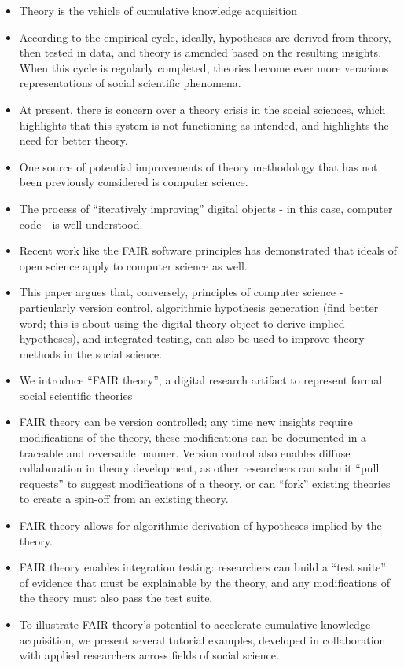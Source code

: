 \documentclass[
  man,floatsintext]{apa6}
\providecommand{\tightlist}{%
  \setlength{\itemsep}{0pt}\setlength{\parskip}{0pt}}
\begin{document}
\begin{itemize}
\tightlist
\item
  Theory is the vehicle of cumulative knowledge acquisition
\item
  According to the empirical cycle, ideally, hypotheses are derived from theory, then tested in data, and theory is amended based on the resulting insights. When this cycle is regularly completed, theories become ever more veracious representations of social scientific phenomena.
\item
  At present, there is concern over a theory crisis in the social sciences, which highlights that this system is not functioning as intended, and highlights the need for better theory.
\item
  One source of potential improvements of theory methodology that has not been previously considered is computer science.
\item
  The process of ``iteratively improving'' digital objects - in this case, computer code - is well understood.
\item
  Recent work like the FAIR software principles has demonstrated that ideals of open science apply to computer science as well.
\item
  This paper argues that, conversely, principles of computer science - particularly version control, algorithmic hypothesis generation (find better word; this is about using the digital theory object to derive implied hypotheses), and integrated testing, can also be used to improve theory methods in the social science.
\item
  We introduce ``FAIR theory'', a digital research artifact to represent formal social scientific theories
\item
  FAIR theory can be version controlled; any time new insights require modifications of the theory, these modifications can be documented in a traceable and reversable manner. Version control also enables diffuse collaboration in theory development, as other researchers can submit ``pull requests'' to suggest modifications of a theory, or can ``fork'' existing theories to create a spin-off from an existing theory.
\item
  FAIR theory allows for algorithmic derivation of hypotheses implied by the theory.
\item
  FAIR theory enables integration testing: researchers can build a ``test suite'' of evidence that must be explainable by the theory, and any modifications of the theory must also pass the test suite.
\item
  To illustrate FAIR theory's potential to accelerate cumulative knowledge acquisition, we present several tutorial examples, developed in collaboration with applied researchers across fields of social science.
\end{itemize}
\end{document}
